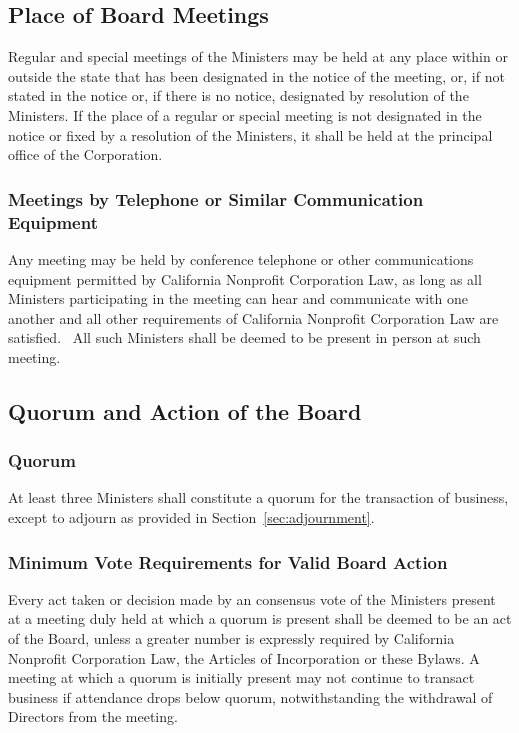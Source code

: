 \documentclass[letterpaper,titlepage]{article}
\begin{document}
\subsection{Place of Board Meetings}
\label{sec:placeMeetings}
Regular and special meetings of the Ministers may be held at any place within
or outside the state that has been designated in the notice of the meeting, or,
if not stated in the notice or, if there is no notice, designated by resolution
of the Ministers. If the place of a regular or special meeting is not
designated in the notice or fixed by a resolution of the Ministers, it shall be
held at the principal office of the Corporation.  
\subsubsection{Meetings by Telephone or Similar Communication Equipment}
\label{sec:meetingsTelephone}
Any meeting may be held by conference telephone or other communications
equipment permitted by California Nonprofit Corporation Law, as long as all
Ministers participating in the meeting can hear and communicate with one
another and all other requirements of California Nonprofit Corporation Law are
satisfied.  All such Ministers shall be deemed to be present in person at such
meeting.
\subsection{Quorum and Action of the Board}
\label{sec:quorumAction}
\subsubsection{Quorum}
\label{sec:quorum}
At least three Ministers shall constitute a quorum for the transaction of
business, except to adjourn as provided in Section~\ref{sec:adjournment}.
\subsubsection{Minimum Vote Requirements for Valid Board Action}
\label{sec:minimumVote}
Every act taken or decision made by an consensus vote of the Ministers present
at a meeting duly held at which a quorum is present shall be deemed to be an
act of the Board, unless a greater number is expressly required by
California Nonprofit Corporation Law, the Articles of Incorporation or these
Bylaws. A meeting at which a quorum is initially present may not continue to
transact business if attendance drops below quorum, notwithstanding the
withdrawal of Directors from the meeting.
\end{document}
